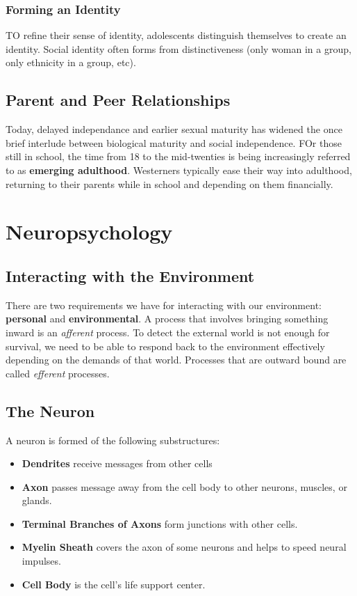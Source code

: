 \documentclass[12pt]{article}
\begin{document}
\subsubsection*{Forming an Identity}
TO refine their sense of identity, adolescents distinguish themselves to create an identity. Social identity often forms from distinctiveness (only woman in a group, only ethnicity in a group, etc).

\subsection*{Parent and Peer Relationships}
Today, delayed independance and earlier sexual maturity has widened the once brief interlude between biological maturity and social independence. FOr those still in school, the time from 18 to the mid-twenties is being increasingly referred to as {\bf emerging adulthood}. Westerners typically ease their way into adulthood, returning to their parents while in school and depending on them financially.

\section*{Neuropsychology}
\subsection*{Interacting with the Environment}
There are two requirements we have for interacting with our environment: \textbf{personal} and \textbf{environmental}. A process that involves bringing something inward is an {\it afferent} process. To detect the external world is not enough for survival, we need to be able to respond back to the environment effectively depending on the demands of that world. Processes that are outward bound are called {\it efferent} processes.

\subsection*{The Neuron}
A neuron is formed of the following substructures:
\begin{itemize}
\item {\bf Dendrites} receive messages from other cells
\item {\bf Axon} passes message away from the cell body to other neurons, muscles, or glands.
\item {\bf Terminal Branches of Axons} form junctions with other cells.
\item {\bf Myelin Sheath} covers the axon of some neurons and helps to speed neural impulses.
\item {\bf Cell Body} is the cell's life support center.
\end{itemize}
\end{document}
